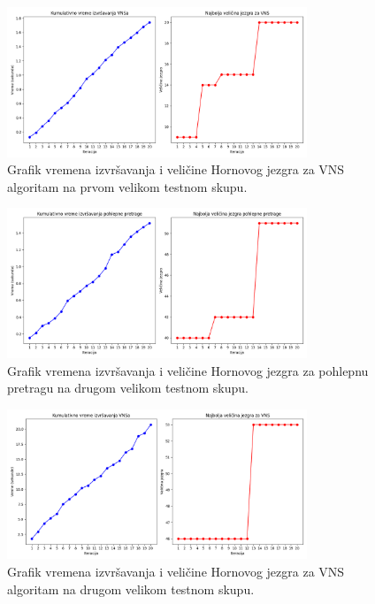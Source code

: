\documentclass[12pt,oneside]{memoir}
\begin{document}
\begin{figure}[H]
    \centering
    \includegraphics[width=0.8\textwidth]{test1_vns_performance.png}
    \caption{Grafik vremena izvršavanja i veličine Hornovog jezgra za VNS algoritam na prvom velikom testnom skupu.}
    \label{fig:test1_vns_performance}
\end{figure}

\begin{figure}[H]
    \centering
    \includegraphics[width=0.8\textwidth]{test2_greedy_performance.png}
    \caption{Grafik vremena izvršavanja i veličine Hornovog jezgra za pohlepnu pretragu na drugom velikom testnom skupu.}
    \label{fig:test2_greedy_performance}
\end{figure}

\begin{figure}[H]
    \centering
    \includegraphics[width=0.8\textwidth]{test2_vns_performance.png}
    \caption{Grafik vremena izvršavanja i veličine Hornovog jezgra za VNS algoritam na drugom velikom testnom skupu.}
    \label{fig:test2_vns_performance}
\end{figure}
\end{document}

